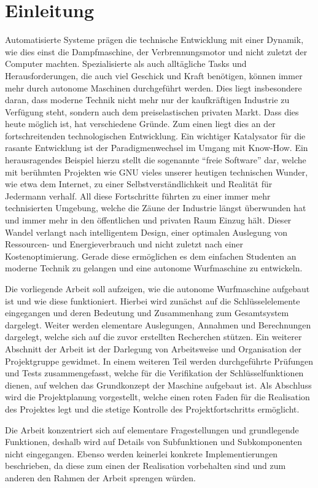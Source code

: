 \section{Einleitung}
Automatisierte Systeme prägen die technische Entwicklung mit einer Dynamik,
wie dies einst die Dampfmaschine, der Verbrennungsmotor und nicht zuletzt der
Computer machten. Spezialisierte als auch alltägliche Tasks und 
Herausforderungen, die auch viel Geschick und Kraft benötigen, können immer
mehr durch autonome Maschinen durchgeführt werden. Dies liegt insbesondere
daran, dass moderne Technik nicht mehr nur der kaufkräftigen Industrie zu
Verfügung steht, sondern auch dem preiselastischen privaten Markt. Dass dies
heute möglich ist, hat verschiedene Gründe. Zum einen liegt dies an der
fortschreitenden technologischen Entwicklung. Ein wichtiger Katalysator für
die rasante Entwicklung ist der Paradigmenwechsel im Umgang mit Know-How.
Ein herausragendes Beispiel hierzu stellt die sogenannte 
``freie Software'' dar, welche mit berühmten Projekten wie GNU vieles
unserer heutigen technischen Wunder, wie etwa dem Internet, zu einer
Selbstverständlichkeit und Realität für Jedermann verhalf.
All diese Fortschritte führten zu einer immer mehr technisierten
Umgebung, welche die Zäune der Industrie längst überwunden hat und immer
mehr in den öffentlichen und privaten Raum Einzug hält. Dieser Wandel
verlangt nach intelligentem Design, einer optimalen Auslegung von
Ressourcen- und Energieverbrauch und nicht zuletzt nach einer
Kostenoptimierung. Gerade diese ermöglichen es dem einfachen Studenten an
moderne Technik zu gelangen und eine autonome Wurfmaschine zu
entwickeln. 

Die vorliegende Arbeit soll aufzeigen, wie die autonome Wurfmaschine
aufgebaut ist und wie diese funktioniert. Hierbei wird zunächst auf die
Schlüsselelemente eingegangen und deren Bedeutung und Zusammenhang
zum Gesamtsystem dargelegt. Weiter werden elementare Auslegungen, Annahmen
und Berechnungen dargelegt, welche sich auf die zuvor erstellten Recherchen
stützen. Ein weiterer Abschnitt der Arbeit ist der Darlegung von Arbeitsweise
und Organisation der Projektgruppe gewidmet. In einem weiteren Teil werden
durchgeführte Prüfungen und Tests zusammengefasst, welche für die Verifikation
der Schlüsselfunktionen dienen, auf welchen das Grundkonzept der Maschine
aufgebaut ist. Als Abschluss wird die Projektplanung vorgestellt, welche
einen roten Faden für die Realisation des Projektes legt und die stetige
Kontrolle des Projektfortschritts ermöglicht.

Die Arbeit konzentriert sich auf elementare Fragestellungen und grundlegende
Funktionen, deshalb wird auf Details von Subfunktionen und Subkomponenten
nicht eingegangen. Ebenso werden keinerlei konkrete Implementierungen 
beschrieben, da diese zum einen der Realisation vorbehalten sind und zum
anderen den Rahmen der Arbeit sprengen würden.

